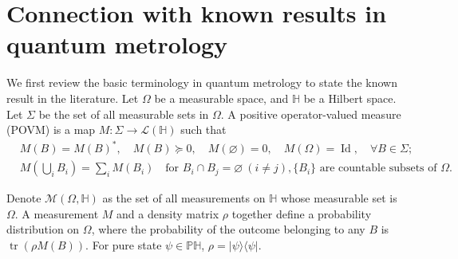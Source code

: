 \documentclass{amsart}
\theoremstyle{plain}
\theoremstyle{definition}
\theoremstyle{remark}
\begin{document}
\section{Connection with known results in quantum metrology}
\label{sec:relation}

We first review the basic terminology in quantum metrology to state the known result in the literature.
Let $\Omega$ be a measurable space, and $\mathbb H$ be a Hilbert space. Let $\Sigma$ be the set of all measurable sets in $\Omega$. A positive operator-valued measure (POVM) is a map $M:\Sigma\to \mathcal L(\mathbb H)$ such that
\[
\begin{aligned}
&M(B) = M(B)^*, \quad M(B) \succeq 0, \quad M(\varnothing) = 0, \quad M(\Omega) = \operatorname{Id},\quad \forall B\in\Sigma; \\
&M\left(\bigcup_{i} B_i\right) = \sum_i M(B_i) \quad \text{for } B_i \cap B_j = \varnothing \ (i \neq j),
\{B_i\} \text{ are countable subsets of } \Omega.
\end{aligned}
\]

Denote $\mathcal M(\Omega,\mathbb H)$ as the set of all measurements on $\mathbb H$ whose measurable set is $\Omega$. A measurement $M$ and a density matrix $\rho$ together define a probability distribution on $\Omega$, where the probability of the outcome belonging to any $B$ is $\operatorname{tr}(\rho M(B))$. For pure state $\psi\in\mathbb P\mathbb H$, $\rho=|\psi\rangle\langle\psi|$.
\end{document}
